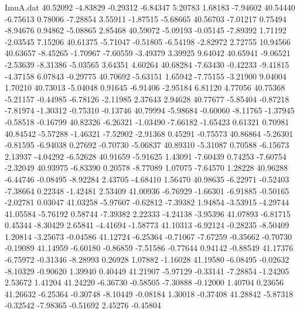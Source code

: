 \begin{filecontents}{ImuA.dat}
  40.52092   -4.83829   -0.29312   -6.84347    5.20783    1.68183   -7.94602
  40.54440   -6.75613    0.78006   -7.28854    3.55911   -1.87515   -5.68665
  40.56703   -7.01217    0.75494   -8.94676    0.94862   -5.08865    2.85468
  40.59072   -5.09193   -0.05145   -7.89392    1.71192   -2.03545    7.15206
  40.61375   -5.71047   -0.51805   -6.54198   -2.82972    2.72755   10.94566
  40.63657   -8.45265   -1.70967   -7.60559   -3.49379    3.39925    9.64042
  40.65941   -9.06521   -2.53639   -8.31386   -5.03565    3.64351    4.60264
  40.68284   -7.63430   -0.42233   -9.41815   -4.37158    6.07843   -0.29775
  40.70692   -5.63151    1.65942   -7.75155   -3.21900    9.04004    1.70210
  40.73013   -5.04048    0.91645   -6.91406   -2.95184    6.81120    4.77056
  40.75368   -5.21157   -0.44985   -6.78126   -2.11985    2.37643    2.94628
  40.77677   -5.85404   -0.87218   -7.81974   -1.30312   -0.75310   -0.13746
  40.79994   -5.98684   -0.60060   -8.11765   -1.37945   -0.58518   -0.16799
  40.82326   -6.26321   -1.03490   -7.66182   -1.65423    0.61321    0.70981
  40.84542   -5.57288   -1.46321   -7.52902   -2.91368    0.45291   -0.75573
  40.86864   -5.26301   -0.81595   -6.94038    0.27692   -0.70730   -5.06837
  40.89310   -5.31087    0.70588   -6.15673    2.13937   -4.04292   -6.52628
  40.91659   -5.91625    1.43091   -7.60439    0.74253   -7.60754   -2.32049
  40.93975   -6.83390    0.20578   -8.77089    1.07075   -7.64570    1.28228
  40.96288   -6.44746   -0.08495   -8.92284    2.43705   -4.68410    1.56470
  40.98635   -6.22971   -0.52403   -7.38664    0.22348   -1.42481    2.53409
  41.00936   -6.76929   -1.66301   -6.91885   -0.50165   -2.02781    0.03047
  41.03258   -5.97607   -0.62812   -7.39382    1.94854   -3.53915   -4.29744
  41.05584   -5.76192    0.58744   -7.39382    2.22333   -4.24138   -3.95396
  41.07893   -6.81715    0.45344   -8.30429    2.65841   -4.41694   -1.58773
  41.10313   -6.92124   -0.28235   -8.50409    1.20814   -3.25673   -0.04586
  41.12724   -6.25364   -0.71067   -7.67259   -0.35662   -0.70730   -0.19089
  41.14959   -6.60180   -0.86859   -7.51586   -0.77644    0.94142   -0.88549
  41.17376   -6.75972   -0.31346   -8.28993    0.26928    1.07882   -1.16028
  41.19580   -6.08495   -0.02632   -8.10329   -0.90620    1.39940    0.40449
  41.21907   -5.97129   -0.33141   -7.28854   -1.24205    2.53672    1.41204
  41.24220   -6.36730   -0.58505   -7.30888   -0.12000    1.40704    0.23656
  41.26632   -6.25364   -0.30748   -8.10449   -0.08184    1.30018   -0.37408
  41.28842   -5.87318   -0.32542   -7.98365   -0.51692    2.45276   -0.45804

\end{filecontents}
